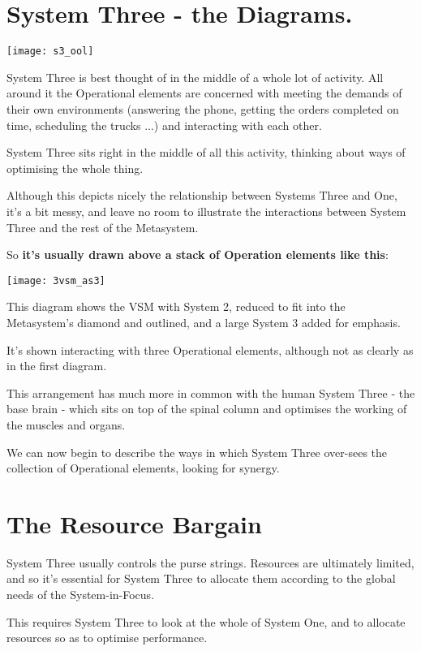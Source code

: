\section*{System Three - the Diagrams.}
\begin{center}
\texttt{[image: s3\_ool]}
\end{center}

System Three is best thought of in the middle of a whole lot of activity. All around it the Operational elements are concerned with meeting the demands of their own environments (answering the phone, getting the orders completed on time, scheduling the trucks ...) and interacting with each other.

System Three sits right in the middle of all this activity, thinking about ways of optimising the whole thing.

Although this depicts nicely the relationship between Systems Three and One, it's a bit messy, and leave no room to illustrate the interactions between System Three and the rest of the Metasystem.

So \textbf{it's usually drawn above a stack of Operation elements like this}:

\begin{center}
\texttt{[image: 3vsm\_as3]}
\end{center}

This diagram shows the VSM with System 2, reduced to fit into the Metasystem's diamond and outlined, and a large System 3 added for emphasis.

It's shown interacting with three Operational elements, although not as clearly as in the first diagram.

This arrangement has much more in common with the human System Three - the base brain - which sits on top of the spinal column and optimises the working of the muscles and organs.

We can now begin to describe the ways in which System Three over-sees the collection of Operational elements, looking for synergy.

\section*{The Resource Bargain}
System Three usually controls the purse strings. Resources are ultimately limited, and so it's essential for System Three to allocate them according to the global needs of the System-in-Focus.

This requires System Three to look at the whole of System One, and to allocate resources so as to optimise performance.

